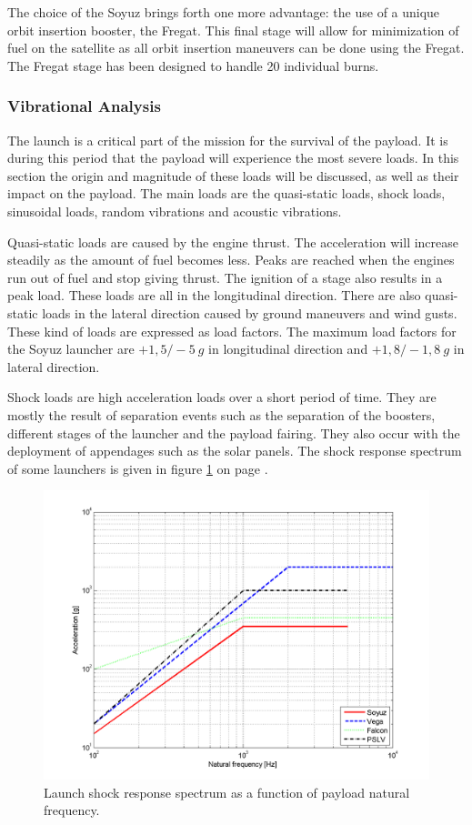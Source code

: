 The choice of the Soyuz brings forth one more advantage: the use of a unique orbit insertion booster, the Fregat. This final stage will allow for minimization of fuel on the satellite as all orbit insertion maneuvers can be done using the Fregat. The Fregat stage has been designed to handle 20 individual burns.

\subsubsection{Vibrational Analysis}
\label{frLVCA}
The launch is a critical part of the mission for the survival of the payload. It is during this period that the payload will experience the most severe loads. In this section the origin and magnitude of these loads will be discussed, as well as their impact on the payload. The main loads are the quasi-static loads, shock loads, sinusoidal loads, random vibrations and acoustic vibrations.

Quasi-static loads are caused by the engine thrust. The acceleration will increase steadily as the amount of fuel becomes less. Peaks are reached when the engines run out of fuel and stop giving thrust. The ignition of a stage also results in a peak load. These loads are all in the longitudinal direction. There are also quasi-static loads in the lateral direction caused by ground maneuvers and wind gusts. These kind of loads are expressed as load factors. The maximum load factors for the Soyuz launcher are $+1,5/-5\ g$ in longitudinal direction and $+1,8/-1,8\ g$ in lateral direction.

Shock loads are high acceleration loads over a short period of time. They are mostly the result of separation events such as the separation of the boosters, different stages of the launcher and the payload fairing. They also occur with the deployment of appendages such as the solar panels. The shock response spectrum of some launchers is given in figure \ref{fig:SRS} on page \pageref{fig:SRS}.

\begin{figure}[ht!]
\centering
\includegraphics[width=1.0\textwidth, angle=0]{chapters/img/Shock_Loads_Acceleration.png}
\caption{Launch shock response spectrum as a function of payload natural frequency.}
\label{fig:SRS}
\end{figure}

